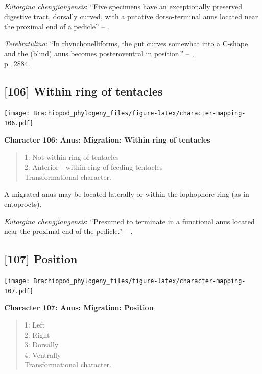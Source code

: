 \documentclass[openany]{book}
\theoremstyle{definition}
\theoremstyle{definition}
\theoremstyle{definition}
\theoremstyle{remark}
\begin{document}
\emph{Kutorgina chengjiangensis}: ``Five specimens have an exceptionally
preserved digestive tract, dorsally curved, with a putative
dorso-terminal anus located near the proximal end of a pedicle'' --
\citet{Zhang2007Rhynchonelliformeanbrachiopods}.

\emph{Terebratulina}: ``In rhynchonelliforms, the gut curves somewhat
into a C-shape and the (blind) anus becomes posteroventral in
position.'' -- \citet{Williams2007PartH},\\
p.~2884.

\hypertarget{within-ring-of-tentacles}{%
\subsection*{{[}106{]} Within ring of
tentacles}\label{within-ring-of-tentacles}}

\texttt{[image: Brachiopod\_phylogeny\_files/figure-latex/character-mapping-106.pdf]}

\textbf{Character 106: Anus: Migration: Within ring of tentacles}

\begin{quote}
1: Not within ring of tentacles\\
2: Anterior - within ring of feeding tentacles\\
Transformational character.
\end{quote}

A migrated anus may be located laterally or within the lophophore ring
(as in entoprocts).

\emph{Kutorgina chengjiangensis}: ``Presumed to terminate in a
functional anus located near the proximal end of the pedicle.'' --
\citet{Zhang2007Rhynchonelliformeanbrachiopods}.

\hypertarget{position}{%
\subsection*{{[}107{]} Position}\label{position}}

\texttt{[image: Brachiopod\_phylogeny\_files/figure-latex/character-mapping-107.pdf]}

\textbf{Character 107: Anus: Migration: Position}

\begin{quote}
1: Left\\
2: Right\\
3: Dorsally\\
4: Ventrally\\
Transformational character.
\end{quote}
\end{document}

